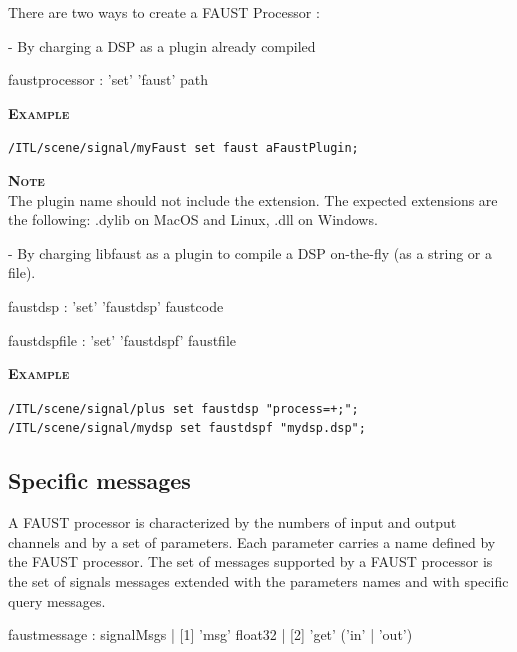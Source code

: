 \documentclass[a4paper,twoside]{report}
\newcommand{\subsublevel}[1]	{\subsection{#1}}
\newcommand{\example}		{\textbf{\hspace{-1.5cm}\textbf{\textsc{Example }}}}
\newcommand{\note}	[1]		{\vspace{2mm}\textbf{\hspace{-1.03cm}\textbf{\textsc{Note #1}}}}
\let\olditemize\itemize
\let\oldenditemize\enditemize
\renewenvironment{itemize} 	{\olditemize \setlength{\itemsep}{1mm}}{\oldenditemize}
\newcommand{\sample}	[1]			{\vspace{-2mm}\begin{center}\colorbox{mygrey}{
								\begin{minipage}[t]{0.9\columnwidth} 
								{\small \texttt{#1}}
								\end{minipage}}\end{center}}
\begin{document}
There are two ways to create a FAUST Processor : 
\begin{itemize}
\item [1]- By charging a DSP as a plugin already compiled \\

\begin{rail}
faustprocessor : 'set' 'faust' path
\end{rail}

\example \\
\sample{/ITL/scene/signal/myFaust set faust aFaustPlugin;}

\note{} \\
The plugin name should not include the extension. The expected extensions are the following: .dylib on MacOS and Linux, .dll on Windows. \\

\item [2]- By charging libfaust as a plugin to compile a DSP on-the-fly  (as a string or a file). \\
\begin{rail}
faustdsp : 'set' 'faustdsp' faustcode
\end{rail}

\vspace{0.3cm}

\begin{rail}
faustdspfile : 'set' 'faustdspf' faustfile
\end{rail}

\example \\
\sample{/ITL/scene/signal/plus set faustdsp "process=+;"; \\
/ITL/scene/signal/mydsp set faustdspf "mydsp.dsp";
}

\end{itemize}

\subsublevel{Specific messages}
\label{faustmsg}
A FAUST processor is characterized by the numbers of input and output channels and by a set of parameters. Each parameter carries a name defined by the FAUST processor. The set of messages supported by a FAUST processor is the set of signals messages extended with the parameters names and with specific query messages. 

\begin{rail}
faustmessage : signalMsgs
			 | [1] 'msg' float32
			 | [2] 'get' ('in' | 'out')
\end{rail}
\end{document}
